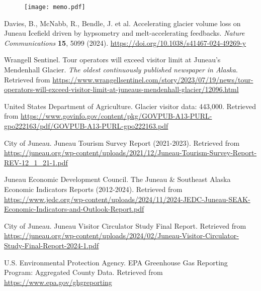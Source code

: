 \documentclass{mcmthesis}
\begin{document}
\newpage
{} %
\thispagestyle{empty} %

\begin{figure}[p] %
  \centering
  \texttt{[image: memo.pdf]} %
  \label{fig:fullpage}
\end{figure}

\restoregeometry %
\begin{thebibliography}{99}
  Davies, B., McNabb, R., Bendle, J. et al. 
  Accelerating glacier volume loss on Juneau Icefield driven by hypsometry and melt-accelerating feedbacks. 
  \textit{Nature Communications} \textbf{15}, 5099 (2024). 
  \url{https://doi.org/10.1038/s41467-024-49269-y}
  
  Wrangell Sentinel. 
  Tour operators will exceed visitor limit at Juneau's Mendenhall Glacier. 
  \emph{The oldest continuously published newspaper in Alaska}. 
  Retrieved from \url{https://www.wrangellsentinel.com/story/2023/07/19/news/tour-operators-will-exceed-visitor-limit-at-juneaus-mendenhall-glacier/12096.html}
  
  United States Department of Agriculture. 
  Glacier visitor data: 443,000. 
  Retrieved from \url{https://www.govinfo.gov/content/pkg/GOVPUB-A13-PURL-gpo222163/pdf/GOVPUB-A13-PURL-gpo222163.pdf}
  
  City of Juneau. 
  Juneau Tourism Survey Report (2021-2023). 
  Retrieved from \url{https://juneau.org/wp-content/uploads/2021/12/Juneau-Tourism-Survey-Report-REV-12_1_21-1.pdf}
  
  Juneau Economic Development Council. 
  The Juneau \& Southeast Alaska Economic Indicators Reports (2012-2024). 
  Retrieved from \url{https://www.jedc.org/wp-content/uploads/2024/11/2024-JEDC-Juneau-SEAK-Economic-Indicators-and-Outlook-Report.pdf}
  
  City of Juneau. 
  Juneau Visitor Circulator Study Final Report. 
  Retrieved from \url{https://juneau.org/wp-content/uploads/2024/02/Juneau-Visitor-Circulator-Study-Final-Report-2024-1.pdf}
  
  U.S. Environmental Protection Agency. 
  EPA Greenhouse Gas Reporting Program: Aggregated County Data. 
  Retrieved from \url{https://www.epa.gov/ghgreporting}
  

\end{thebibliography}
\end{document}

